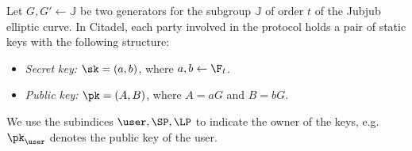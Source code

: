 
Let $G, G'\gets\mathbb{J}$ be two generators for the subgroup $\mathbb{J}$ of order $t$ of the Jubjub elliptic curve. 
In Citadel, each party involved in the protocol holds a pair of static keys with the following structure:

\begin{itemize}
	\item \textit{Secret key:} $\sk = (a,b)$, where $a,b\gets \F_t$.
	\item \textit{Public key:} $\pk = (A,B)$, where $A = a G$ and $B = b G$.
\end{itemize}

We use the subindices $\user, \SP, \LP$ to indicate the owner of the keys, e.g. $\pk_\user$ denotes the public key of the user.